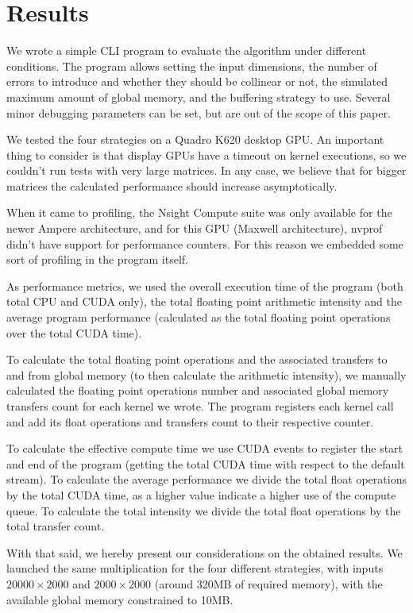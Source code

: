 \section{Results}
\label{sec:results}

We wrote a simple CLI program to evaluate the algorithm under different conditions.
The program allows setting the input dimensions, the number of errors to introduce
and whether they should be collinear or not,
the simulated maximum amount of global memory, and the buffering strategy to use.
Several minor debugging parameters can be set, but are out of the scope of this paper.

We tested the four strategies on a Quadro K620 desktop GPU. An important thing to consider is that display GPUs have a timeout on kernel executions, so we couldn't run tests with very large matrices. In any case, we believe that for bigger matrices the calculated performance should increase asymptotically.

When it came to profiling, the Nsight Compute suite was only available for the newer Ampere architecture, and for this GPU (Maxwell architecture), nvprof didn't have support for performance counters. For this reason we embedded some sort of profiling in the program itself.

As performance metrics, we used the overall execution time of the program (both total CPU and CUDA only), the total floating point arithmetic intensity and the average program performance (calculated as the total floating point operations over the total CUDA time).

To calculate the total floating point operations and the associated transfers to and from global memory (to then calculate the arithmetic intensity), we manually calculated the floating point operations number and associated global memory transfers count for each kernel we wrote. The program registers each kernel call and add its float operations and transfers count to their respective counter.

To calculate the effective compute time we use CUDA events to register the start and end of the program (getting the total CUDA time with respect to the default stream).
To calculate the average performance we divide the total float operations by the total CUDA time, as a higher value indicate a higher use of the compute queue.
To calculate the total intensity we divide the total float operations by the total transfer count.

With that said, we hereby present our considerations on the obtained results.
We launched the same multiplication for the four different strategies, with inputs $20000 \times 2000$ and $2000 \times 2000$ (around 320MB of required memory), with the available global memory constrained to 10MB.

